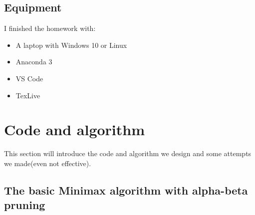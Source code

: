\documentclass[aps,letterpaper,10pt]{revtex4}
\begin{document}
\subsection{Equipment}
I finished the homework with:
	\begin{itemize}
		\item A laptop with Windows 10 or Linux
		\item Anaconda 3
		\item VS Code
		\item TexLive
	\end{itemize}





\newpage
\section{Code and algorithm}
This section will introduce the code and algorithm we design and some attempts we made(even not effective).
\vspace{3mm}



\subsection{The basic Minimax algorithm with alpha-beta pruning}
\end{document}

